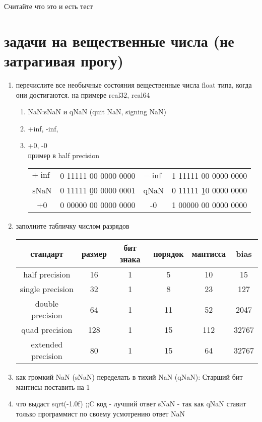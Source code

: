 \documentclass[a4paper,10pt]{article}
\begin{document}
Считайте что это и есть тест

\section*{задачи на вещественные числа (не затрагивая прогу)}
\begin{enumerate}
    \item перечислите все необычные состояния вещественные числа float типа, когда они достигаются. на примере real32, real64
    \begin{enumerate}
        \item NaN:sNaN и qNaN (quit NaN, signing NaN)
        \item +inf, -inf,
        \item +0, -0 \\
        пример в half precision \\
        \begin{tabular}{c c|c c}
            $+\inf$ & 0 11111 00 0000 0000& $-\inf$& 1 11111 00 0000 0000\\
            sNaN & 0 11111 \b{0}0 0000 0001 & qNaN& 0 11111 \b{1}0 0000 0000\\
            +0 & 0 00000 00 0000 0000 & -0 & 1 00000 00 0000 0000\\
        \end{tabular}
    \end{enumerate}
    \item заполните табличку числом разрядов \\
    \begin{tabular}{|c|c|c|c|c|c|}
        \hline
        стандарт& размер & бит знака & порядок & мантисса & bias \\
        \hline
        half precision & 16 & 1 & 5 & 10& 15\\
        \hline
        single precision & 32 & 1 & 8 & 23 & 127\\
        \hline
        double precision & 64 & 1 & 11 & 52 & 2047\\
        \hline
        quad precision &128 & 1 & 15 & 112 & 32767 \\
        \hline
        extended precision &80& 1 & 15 & 64 & 32767 \\
        \hline
    \end{tabular}
    \item как громкий NaN (sNaN) переделать в тихий NaN (qNaN): Старший бит мантисы поставить на 1 
    \item что выдаст sqrt(-1.0f) ;;C код - лучший ответ sNaN - так как qNaN ставит только программист по своему усмотрению ответ NaN

\end{enumerate}
\end{document}

